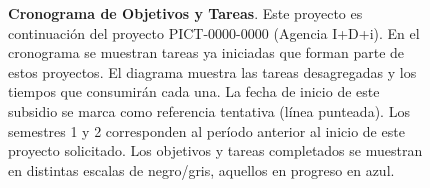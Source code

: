 \makeatletter
\setlength{\@fptop}{0pt}
\makeatother

\begin{figure}
	

	\caption{{\bfseries{Cronograma de Objetivos y Tareas}}. Este proyecto es
	continuación del proyecto PICT-0000-0000 (Agencia I+D+i). En el
	cronograma se muestran tareas ya iniciadas que forman parte de estos
	proyectos. El diagrama muestra las tareas desagregadas y los tiempos que
	consumirán cada una. La fecha de inicio de este subsidio se marca como
	referencia tentativa (línea punteada). Los semestres 1 y 2 corresponden al
	período anterior al inicio de este proyecto solicitado. Los objetivos y
	tareas completados se muestran en distintas escalas de negro/gris, aquellos
	en progreso en azul.}\label{fig:cronograma}

\end{figure}



